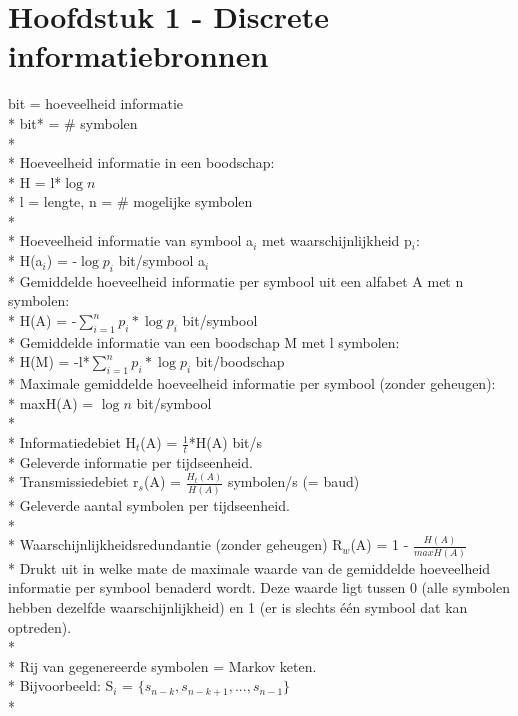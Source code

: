 \documentclass[10pt]{article}
\begin{document}
\section{Hoofdstuk 1 - Discrete informatiebronnen}
bit = hoeveelheid informatie\\*
bit* = \# symbolen\\*\\*
Hoeveelheid informatie in een boodschap:\\*
H = l*$\log n$\\*
{\scriptsize l = lengte, n = $\#$ mogelijke symbolen}\\*\\*
Hoeveelheid informatie van symbool a$_i$ met waarschijnlijkheid p$_i$:\\*
H(a$_i$) = -$\log p_i$ bit/symbool a$_i$\\*
Gemiddelde hoeveelheid informatie per symbool uit een alfabet A met n symbolen:\\*
H(A) = -$\sum_{i=1}^n p_i*\log p_i$ bit/symbool\\*
Gemiddelde informatie van een boodschap M met l symbolen:\\*
H(M) = -l*$\sum_{i=1}^n p_i*\log p_i$ bit/boodschap\\*
Maximale gemiddelde hoeveelheid informatie per symbool (zonder geheugen):\\*
maxH(A) = $\log n$ bit/symbool\\*\\*
Informatiedebiet H$_t$(A) = $\frac{1}{t}$*H(A) bit/s\\*
{\scriptsize Geleverde informatie per tijdseenheid.}\\*
Transmissiedebiet r$_s$(A) = $\frac{H_t(A)}{H(A)}$ symbolen/s (= baud)\\*
{\scriptsize Geleverde aantal symbolen per tijdseenheid.}\\*\\*
Waarschijnlijkheidsredundantie (zonder geheugen) R$_w$(A) = 1 - $\frac{H(A)}{maxH(A)}$\\*
{\scriptsize Drukt uit in welke mate de maximale waarde van de gemiddelde hoeveelheid informatie per symbool benaderd wordt. Deze waarde ligt tussen 0 (alle symbolen hebben dezelfde waarschijnlijkheid) en 1 (er is slechts \'e\'en symbool dat kan optreden).}\\*\\*
Rij van gegenereerde symbolen = Markov keten.\\*
Bijvoorbeeld: S$_i$ = $\{s_{n-k}, s_{n-k+1}, ..., s_{n-1}\}$\\*
\end{document}
